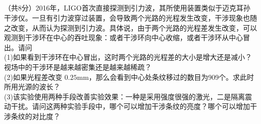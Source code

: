 \subsection{ }
（共8分）2016年，LIGO首次直接探测到引力波，其所使用装置类似于迈克耳孙干涉仪。一旦有引力波穿过装置，会导致两个光路的光程发生改变，干涉现象也随之改变，从而认为探测到引力波。具体说，由于两个光路的光程差发生改变，可以观测到干涉环在中心的吞吐现象：或者干涉环向中心收缩，或者干涉环从中心冒出。请问\\
(1)如果看到干涉环在中心冒出，这时两个光路的光程差的大小是增大还是减小？视场中的干涉环是越来越密集还是越来越稀疏？\\
(2)如果光程差改变 $0.25\mathrm{mm}$，那么会看到中心处条纹移过的数目为909个。求此时所用光源的波长？\\
(3)该实验使用两种手段改善实验效果：一种是采用强度很强的激光，二是隔离震动干扰。请问这两种实验手段中，哪个可以增加干涉条纹的亮度？哪个可以增加干涉条纹的对比度？
